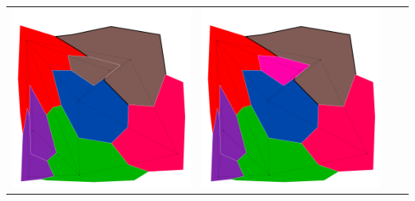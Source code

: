 \documentclass[10pt,a4paper]{article}
\begin{document}
\begin{tabular}{c c c c }
	\includegraphics[scale=.10]{../results/backtracking_forward/map_build/bt_forward_I00007.pdf}&
	\includegraphics[scale=.10]{../results/backtracking_forward/map_build/bt_forward_I00008.pdf}\\
	

\end{tabular}
\end{document}
